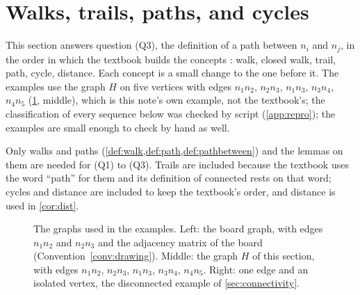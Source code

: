 \section{Walks, trails, paths, and cycles}\label{sec:walks}

This section answers question (Q3), the definition of a path between $n_i$
and $n_j$, in the order in which the textbook builds the concepts
\cite[pp.~21--23]{petrosyan2015graphs}: walk, closed walk, trail, path,
cycle, distance. Each concept is a small change to the one before it. The
examples use the graph $H$ on five vertices with edges $n_1n_2$, $n_2n_3$,
$n_1n_3$, $n_3n_4$, $n_4n_5$ (\cref{fig:graphs}, middle), which is this
note's own example, not the textbook's; the classification of every
sequence below was checked by script (\cref{app:repro}); the examples are
small enough to check by hand as well.

Only walks and paths (\cref{def:walk,def:path,def:pathbetween}) and the
lemmas on them are needed for (Q1) to (Q3). Trails are included because the
textbook uses the word ``path'' for them and its definition of connected
rests on that word; cycles and distance are included to keep the textbook's
order, and distance is used in \cref{cor:dist}.

\begin{figure}[ht]
\centering
{}
\caption{The graphs used in the examples. Left: the board graph, with
edges $n_1n_2$ and $n_2n_3$ and the adjacency matrix of the board
(Convention~\ref{conv:drawing}). Middle: the graph $H$ of this section, with edges $n_1n_2$, $n_2n_3$,
$n_1n_3$, $n_3n_4$, $n_4n_5$.
Right: one edge and an isolated vertex, the disconnected example of
\cref{sec:connectivity}.}\label{fig:graphs}
\end{figure}

